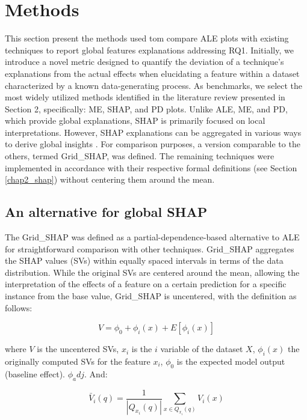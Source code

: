 \section{Methods}

This section present the methods used tom compare \gls{ALE} plots with existing techniques to report global features explanations addressing RQ1. Initially, we introduce a novel metric designed to quantify the deviation of a technique's explanations from the actual effects when elucidating a feature within a dataset characterized by a known data-generating process. As benchmarks, we select the most widely utilized methods identified in the literature review presented in Section 2, specifically: \gls{ME}, \gls{SHAP}, and \gls{PD} plots. Unlike \gls{ALE}, \gls{ME}, and \gls{PD}, which provide global explanations, \gls{SHAP} is primarily focused on local interpretations. However, \gls{SHAP} explanations can be aggregated in various ways to derive global insights \cite{Lundberg2020FromTrees.}. For comparison purposes, a version comparable to the others, termed Grid\_SHAP, was defined. The remaining techniques were implemented in accordance with their respective formal definitions (see Section \ref{chap2_shap}) without centering them around the mean.


\subsection{An alternative for global SHAP}

The Grid\_SHAP was defined as a partial-dependence-based alternative to \gls{ALE} for straightforward comparison with other techniques. Grid\_SHAP aggregates the SHAP values (SVs) within equally spaced intervals in terms of the data distribution. While the original SVs are centered around the mean, allowing the interpretation of the effects of a feature on a certain prediction for a specific instance from the base value, Grid\_SHAP is uncentered, with the definition as follows:

\begin{equation}
 V = \phi_0 + \phi_i(x) + E[\phi_i(x)]
\label{shapley_1}
\end{equation}

where \(V\) is the uncentered SVs, $x_i$ is the $i$ variable of the dataset $X$, $\phi_i(x)$ the originally computed SVs for the feature $x_i$, $\phi_0$ is the expected model output (baseline effect).  $\phi_adj$. And:

\begin{equation}
\bar{V}_{i}(q) = \frac{1}{|Q_{x_i}(q)|} \sum_{x \in Q_{x_i}(q)} V_i(x)
\label{gridShap}
\end{equation}

